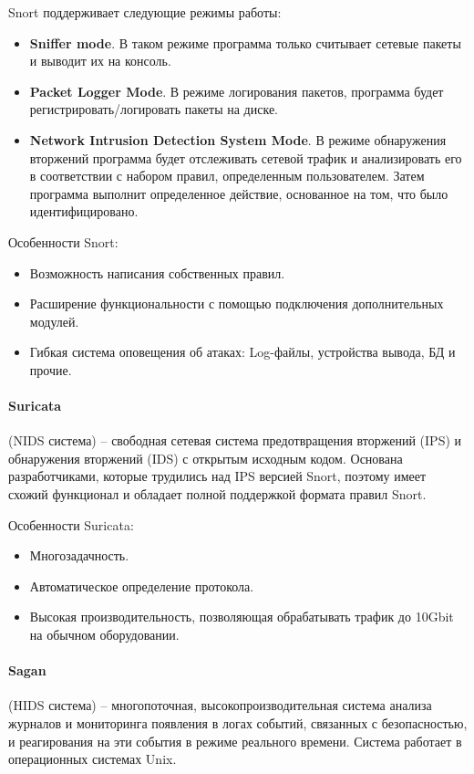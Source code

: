 Snort поддерживает следующие режимы работы:
\begin{itemize}
	\item \textbf{Sniffer mode}. В таком режиме программа только считывает сетевые пакеты и 
	выводит их на консоль. 

	\item \textbf{Packet Logger Mode}. В режиме логирования пакетов, программа будет 
	регистрировать/логировать пакеты на диске.

	\item \textbf{Network Intrusion Detection System Mode}. В режиме обнаружения вторжений 
	программа будет отслеживать сетевой трафик и анализировать его в соответствии с набором 
	правил, определенным пользователем. Затем программа выполнит определенное действие, 
	основанное на том, что было идентифицировано.
\end{itemize}

Особенности Snort:
\begin{itemize}
	\item Возможность написания собственных правил.
	\item Расширение функциональности с помощью подключения дополнительных модулей.
	\item Гибкая система оповещения об атаках: Log-файлы, устройства вывода, БД и прочие.
\end{itemize}


\paragraph*{Suricata} (NIDS система) -- свободная сетевая система предотвращения вторжений 
(IPS) и обнаружения вторжений (IDS) с открытым исходным кодом. Основана разработчиками, 
которые трудились над IPS версией Snort, поэтому имеет схожий функционал и обладает полной 
поддержкой формата правил Snort.

Особенности Suricata:
\begin{itemize}
	\item Многозадачность.
	
	\item Автоматическое определение протокола.
	
	\item Высокая производительность, позволяющая обрабатывать трафик до 10Gbit на обычном 
	оборудовании.
\end{itemize}


\paragraph*{Sagan} (HIDS система) -- многопоточная, высокопроизводительная система 
анализа журналов и мониторинга появления в логах событий, связанных с безопасностью, 
и реагирования на эти события в режиме реального времени. Система работает в операционных 
системах Unix. 

